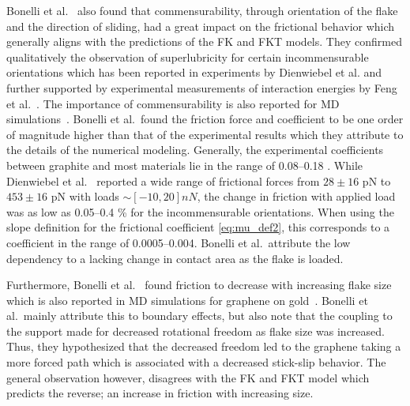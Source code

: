 Bonelli et al.~\cite{bonelli_atomistic_2009} also found that commensurability,
through orientation of the flake and the direction of sliding, had a great
impact on the frictional behavior which generally aligns with the predictions of
the \acrshort{FK} and \acrshort{FKT} models. They confirmed qualitatively the
observation of superlubricity for certain incommensurable orientations which has
been reported in experiments by Dienwiebel et al.\cite{DIENWIEBEL2005197} and
further supported by experimental measurements of interaction energies by Feng
et al.~\cite{feng_superlubric_2013}. The importance of commensurability is also
reported for \acrshort{MD} simulations~\cite{ma12091425, zhu_study_2018,
Wijn_2011}. Bonelli et al.\ found the friction force and coefficient to be one
order of magnitude higher than that of the experimental results which they
attribute to the details of the numerical modeling. Generally, the experimental
coefficients between graphite and most materials lie in the range of 0.08--0.18
\cite{DIENWIEBEL2005197}. While Dienwiebel et al.~\cite{DIENWIEBEL2005197}
reported a wide range of frictional forces from $28 \pm 16$ pN to $453 \pm 16$
pN with loads $\sim [-10, 20] nN$, the change in friction with applied load was
as low as 0.05--0.4 \% for the incommensurable orientations. When using the slope definition for the frictional coefficient \cref{eq:mu_def2}, this corresponds to a coefficient in the range of 0.0005--0.004. Bonelli et al.\ attribute the low dependency to a lacking change in contact area as the flake is loaded. 

Furthermore, Bonelli et al.~\cite{bonelli_atomistic_2009} found friction to decrease with increasing flake size which is also reported in \acrshort{MD} simulations for graphene on gold~\cite{zhu_study_2018}. Bonelli et al.\ mainly attribute this to boundary effects, but also note that the coupling to the support made for decreased rotational freedom as flake size was increased. Thus, they hypothesized that the decreased freedom led to the graphene taking a more forced path which is associated with a decreased stick-slip behavior. The general observation however, disagrees with the \acrshort{FK} and \acrshort{FKT} model which predicts the reverse; an increase in friction with increasing size. 


